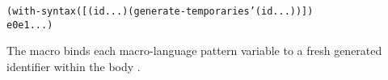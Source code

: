 \begin{syntax}
\end{syntax}
\expandsto{}\begin{alltt}\antipar
(with-syntax ([(id ...) (generate-temporaries '(id ...))])
  e0 e1 ...)\end{alltt}

The  macro binds each macro-language
pattern variable  to a fresh generated identifier
within the body .
